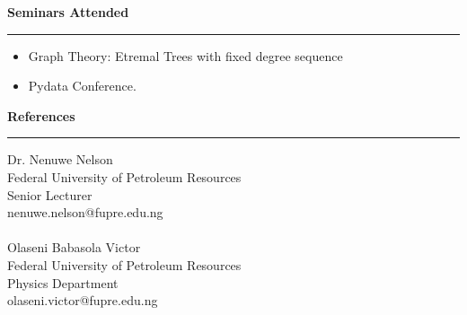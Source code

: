 \documentclass[a4paper]{article}
\begin{document}
	
	
		
		
	
	\noindent \textbf{Seminars Attended}
	\\
\vspace{-2.8mm}
\hrule
\vspace{3.5mm}
\begin{itemize}
\item Graph Theory: Etremal Trees with fixed degree
 sequence
\item Pydata Conference.
\end{itemize}
	



\noindent \textbf{References}
	\\
\vspace{-2.8mm}
\hrule
\vspace{3.5mm}
\noindent 	Dr. Nenuwe Nelson
\\
Federal University of Petroleum Resources\\
Senior Lecturer\\
nenuwe.nelson@fupre.edu.ng\\
\\
\noindent Olaseni Babasola Victor\\
Federal University of Petroleum Resources\\
Physics Department\\
olaseni.victor@fupre.edu.ng\\






 \thispagestyle{empty} 
\end{document}
